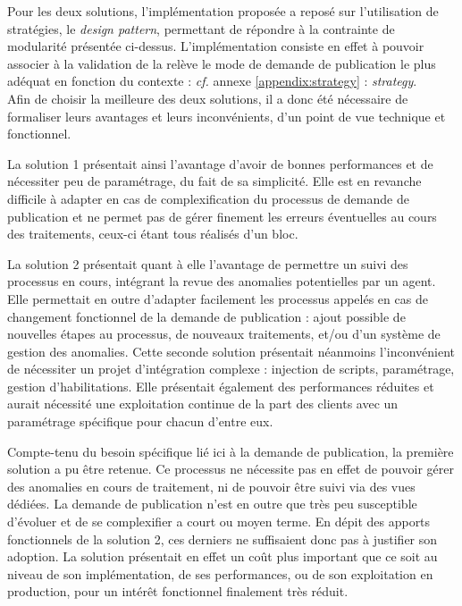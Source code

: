 \documentclass[a4paper, 12pt]{report}
\begin{document}
Pour les deux solutions, l’implémentation proposée a reposé sur l’utilisation de stratégies, le \textit{design pattern}, permettant de répondre à la contrainte de modularité présentée ci-dessus. L’implémentation consiste en effet à pouvoir associer à la validation de la relève le mode de demande de publication le plus adéquat en fonction du contexte : \textit{cf.} annexe \ref{appendix:strategy} : \textit{strategy}.\\

Afin de choisir la meilleure des deux solutions, il a donc été nécessaire de formaliser leurs avantages et leurs inconvénients, d'un point de vue technique et fonctionnel.

La solution 1 présentait ainsi l'avantage d'avoir de bonnes performances et de nécessiter peu de paramétrage, du fait de sa simplicité. Elle est en revanche difficile à adapter en cas de complexification du processus de demande de publication et ne permet pas de gérer finement les erreurs éventuelles au cours des traitements, ceux-ci étant tous réalisés d'un bloc.

La solution 2 présentait quant à elle l'avantage de permettre un suivi des processus en cours, intégrant la revue des anomalies potentielles par un agent. Elle permettait en outre d'adapter facilement les processus appelés en cas de changement fonctionnel de la demande de publication : ajout possible de nouvelles étapes au processus, de nouveaux traitements, et/ou d'un système de gestion des anomalies. Cette seconde solution présentait néanmoins l'inconvénient de nécessiter un projet d'intégration complexe : injection de scripts, paramétrage, gestion d'habilitations. Elle présentait également des performances réduites et aurait nécessité une exploitation continue de la part des clients avec un paramétrage spécifique pour chacun d'entre eux.

Compte-tenu du besoin spécifique lié ici à la demande de publication, la première solution a pu être retenue. Ce processus ne nécessite pas en effet de pouvoir gérer des anomalies en cours de traitement, ni de pouvoir être suivi via des vues dédiées. La demande de publication n'est en outre que très peu susceptible d'évoluer et de se complexifier a court ou moyen terme. En dépit des apports fonctionnels de la solution 2, ces derniers ne suffisaient donc pas à justifier son adoption. La solution présentait en effet un coût plus important que ce soit au niveau de son implémentation, de ses performances, ou de son exploitation en production, pour un intérêt fonctionnel finalement très réduit. 
\end{document}

